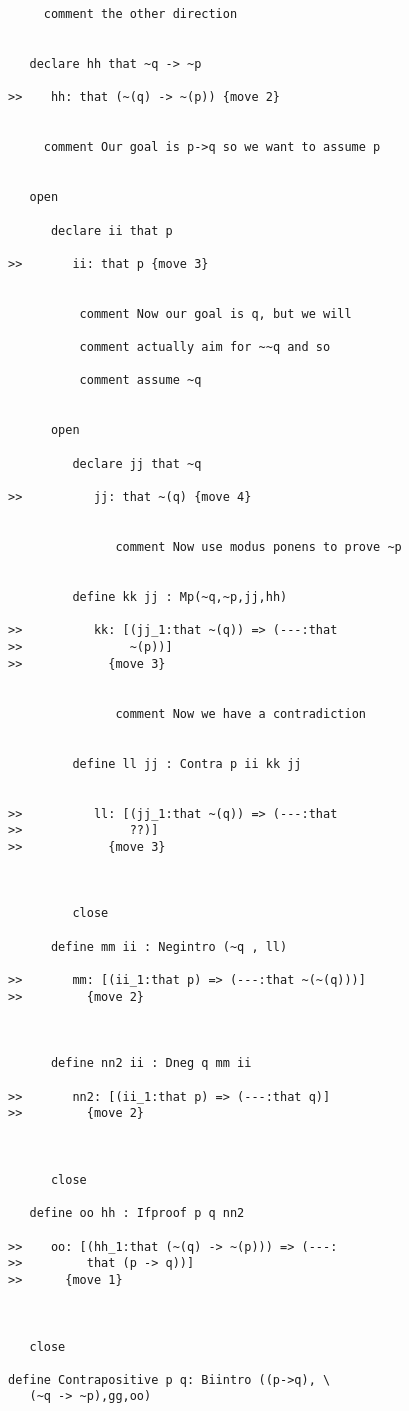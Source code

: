 \documentclass[12pt]{article}
\begin{document}
\begin{verbatim}
     comment the other direction


   declare hh that ~q -> ~p

>>    hh: that (~(q) -> ~(p)) {move 2}


     comment Our goal is p->q so we want to assume p


   open

      declare ii that p

>>       ii: that p {move 3}


          comment Now our goal is q, but we will

          comment actually aim for ~~q and so

          comment assume ~q


      open

         declare jj that ~q

>>          jj: that ~(q) {move 4}


               comment Now use modus ponens to prove ~p


         define kk jj : Mp(~q,~p,jj,hh)

>>          kk: [(jj_1:that ~(q)) => (---:that
>>               ~(p))]
>>            {move 3}


               comment Now we have a contradiction


         define ll jj : Contra p ii kk jj


>>          ll: [(jj_1:that ~(q)) => (---:that
>>               ??)]
>>            {move 3}



         close

      define mm ii : Negintro (~q , ll)

>>       mm: [(ii_1:that p) => (---:that ~(~(q)))]
>>         {move 2}



      define nn2 ii : Dneg q mm ii

>>       nn2: [(ii_1:that p) => (---:that q)]
>>         {move 2}



      close

   define oo hh : Ifproof p q nn2

>>    oo: [(hh_1:that (~(q) -> ~(p))) => (---:
>>         that (p -> q))]
>>      {move 1}



   close

define Contrapositive p q: Biintro ((p->q), \
   (~q -> ~p),gg,oo)


\end{verbatim}
\end{document}
